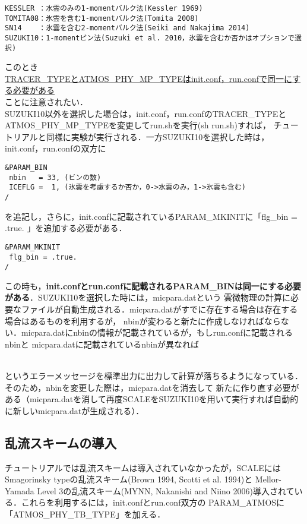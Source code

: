 \begin{verbatim}
KESSLER ：水雲のみの1-momentバルク法(Kessler 1969)
TOMITA08：氷雲を含む1-momentバルク法(Tomita 2008)
SN14    ：氷雲を含む2-momentバルク法(Seiki and Nakajima 2014)
SUZUKI10：1-momentビン法(Suzuki et al. 2010，氷雲を含むか否かはオプションで選択)
\end{verbatim}

このとき\\
\underline{{TRACER\_TYPEとATMOS\_PHY\_MP\_TYPEはinit.conf，run.confで同一にする必要がある}}\\
ことに注意されたい．\\
SUZUKI10以外を選択した場合は，init.conf，run.confのTRACER\_TYPEとATMOS\_PHY\_MP\_TYPEを変更してrun.shを実行(sh run.sh)すれば，
チュートリアルと同様に実験が実行される．一方SUZUKI10を選択した時は，init.conf，run.confの双方に

\begin{verbatim}
&PARAM_BIN
 nbin   = 33, (ビンの数)
 ICEFLG =  1, (氷雲を考慮するか否か，0->水雲のみ，1->氷雲も含む)
/
\end{verbatim}

を追記し，さらに，init.confに記載されているPARAM\_MKINITに「flg\_bin = .true. 」を追加する必要がある．

\begin{verbatim}
&PARAM_MKINIT
 flg_bin = .true.
/
\end{verbatim}

この時も，{\bf init.confとrun.confに記載されるPARAM\_BINは同一にする必要がある}．SUZUKI10を選択した時には，micpara.datという
雲微物理の計算に必要なファイルが自動生成される．micpara.datがすでに存在する場合は存在する場合はあるものを利用するが，
nbinが変わると新たに作成しなければならない．micpara.datにnbinの情報が記載されているが，もしrun.confに記載されるnbinと
micpara.datに記載されているnbinが異なれば

\\

というエラーメッセージを標準出力に出力して計算が落ちるようになっている．そのため，nbinを変更した際は，micpara.datを消去して
新たに作り直す必要がある（micpara.datを消して再度SCALEをSUZUKI10を用いて実行すれば自動的に新しいmicpara.datが生成される）．

\subsection{乱流スキームの導入}
チュートリアルでは乱流スキームは導入されていなかったが，SCALEにはSmagorinsky typeの乱流スキーム(Brown 1994, Scotti et al. 1994)と
Mellor-Yamada Level 3の乱流スキーム(MYNN, Nakanishi and Niino 2006)導入されている．これらを利用するには，init.confとrun.conf双方の
PARAM\_ATMOSに「ATMOS\_PHY\_TB\_TYPE」を加える．

